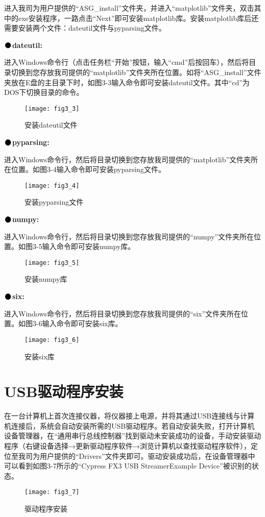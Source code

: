 进入我司为用户提供的“ASG\_install”文件夹，并进入“matplotlib”文件夹，双击其中的exe安装程序，一路点击“Next”即可安装matplotlib库。安装matplotlib库后还需要安装两个文件：dateutil文件与pyparsing文件。
\vspace{0.4cm}

\noindent$\vcenter{\hbox{\huge$\bullet$}}$\quad\fontsize{12pt}{\baselineskip}\textbf{dateutil:}

进入Windows命令行（点击任务栏“开始”按钮，输入“cmd”后按回车），然后将目录切换到您存放我司提供的“matplotlib”文件夹所在位置。如将“ASG\_install”文件夹放在E盘的主目录下时，如图3-3输入命令即可安装dateutil文件。其中“cd”为DOS下切换目录的命令。
\begin{figure}[ht]
\centering
\texttt{[image: fig3\_3]}
\caption{安装dateutil文件}
\end{figure}

\newpage
\noindent$\vcenter{\hbox{\huge$\bullet$}}$\quad\fontsize{12pt}{\baselineskip}\textbf{pyparsing:}

进入Windows命令行，然后将目录切换到您存放我司提供的“matplotlib”文件夹所在位置。如图3-4输入命令即可安装pyparsing文件。

\begin{figure}[H]
\centering
\texttt{[image: fig3\_4]}
\caption{安装pyparsing文件}
\end{figure}

\noindent$\vcenter{\hbox{\huge$\bullet$}}$\quad\fontsize{12pt}{\baselineskip}\textbf{numpy:}

进入Windows命令行，然后将目录切换到您存放我司提供的“numpy”文件夹所在位置。如图3-5输入命令即可安装numpy库。
\begin{figure}[H]
\centering
\texttt{[image: fig3\_5]}
\caption{安装numpy库}
\end{figure}

\noindent$\vcenter{\hbox{\huge$\bullet$}}$\quad\fontsize{12pt}{\baselineskip}\textbf{six:}

进入Windows命令行，然后将目录切换到您存放我司提供的“six”文件夹所在位置。如图3-6输入命令即可安装six库。
\begin{figure}[H]
\centering
\texttt{[image: fig3\_6]}
\caption{安装six库}
\end{figure}

\section{USB\heiti 驱动程序安装}
在一台计算机上首次连接仪器，将仪器接上电源，并将其通过USB连接线与计算机连接后，系统会自动安装所需的USB驱动程序。若自动安装失败，打开计算机设备管理器，在“通用串行总线控制器”找到驱动未安装成功的设备，手动安装驱动程序（右键设备选择→更新驱动程序软件→浏览计算机以查找驱动程序软件），定位至我司为用户提供的“Drivers”文件夹即可。驱动安装成功后，在设备管理器中可以看到如图3-7所示的“Cypress FX3 USB StreamerExample Device”被识别的状态。
\begin{figure}[htbp]
\centering
\texttt{[image: fig3\_7]}
\caption{驱动程序安装}
\end{figure}

